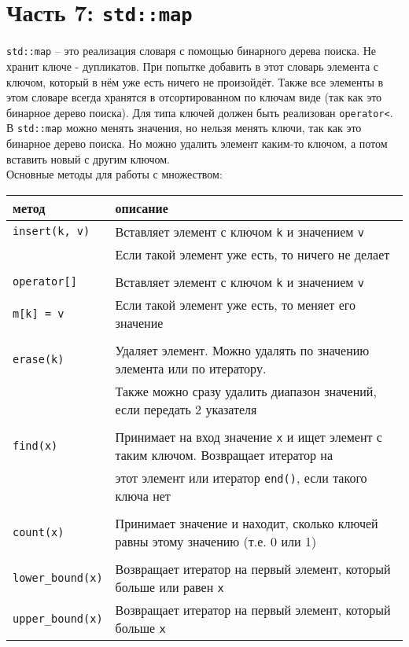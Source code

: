 \documentclass{article}
\begin{document}
\newpage
\section*{Часть 7: \texttt{std::map}}
\texttt{std::map} -- это реализация словаря с помощью бинарного дерева поиска. Не хранит ключе - дупликатов. При попытке добавить в этот словарь элемента с ключом, который в нём уже есть ничего не произойдёт. Также все элементы в этом словаре всегда хранятся в отсортированном по ключам виде (так как это бинарное дерево поиска). Для типа ключей должен быть реализован \texttt{operator<}. В \texttt{std::map} можно менять значения, но нельзя менять ключи, так как это бинарное дерево поиска. Но можно удалить элемент каким-то ключом, а потом вставить новый с другим ключом.\\

Основные методы для работы с множеством:
\begin{center}
\begin{tabular}{ l | l }
 метод & описание \\ \hline
 \texttt{insert(k, v)}  & Вставляет элемент с ключом \texttt{k} и значением \texttt{v}\\
                        & Если такой элемент уже есть, то ничего не делает \\ \\\hline
 \texttt{operator[]}    &  Вставляет элемент с ключом \texttt{k} и значением \texttt{v}\\
 \texttt{m[k] = v}      & Если такой элемент уже есть, то меняет его значение \\ \\\hline
 \texttt{erase(k)}      & Удаляет элемент. Можно удалять по значению элемента или по итератору.  \\ 
                        & Также можно сразу удалить диапазон значений, если передать 2 указателя \\\\ \hline
 \texttt{find(x)}       & Принимает на вход значение \texttt{x} и ищет элемент с таким ключом. Возвращает итератор на \\
                        &  этот элемент или итератор \texttt{end()}, если такого ключа нет\\ \\ \hline
 \texttt{count(x)}      & Принимает значение и находит, сколько ключей равны этому значению (т.е. 0 или 1) \\ \\\hline
 \texttt{lower\_bound(x)}  & Возвращает итератор на первый элемент, который больше или равен \texttt{x} \\
 \texttt{upper\_bound(x)}  & Возвращает итератор на первый элемент, который больше \texttt{x} \\
\end{tabular}
\end{center}
\end{document}

